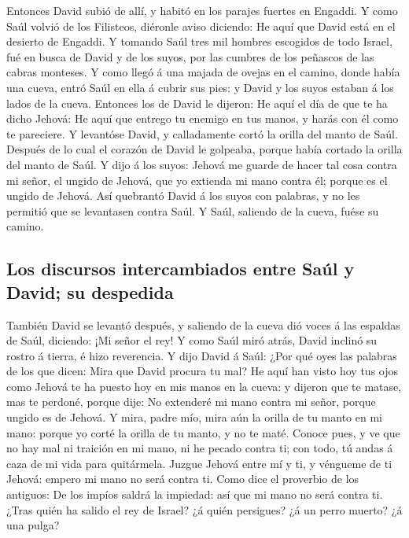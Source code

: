  Entonces David subió de allí, y habitó en los parajes
fuertes en Engaddi.  Y como Saúl volvió de los Filisteos,
diéronle aviso diciendo: He aquí que David está en el desierto de
Engaddi.  Y tomando Saúl tres mil hombres escogidos de todo
Israel, fué en busca de David y de los suyos, por las cumbres de los
peñascos de las cabras monteses.  Y como llegó á una majada
de ovejas en el camino, donde había una cueva, entró Saúl en ella á
cubrir sus pies: y David y los suyos estaban á los lados de la cueva.
 Entonces los de David le dijeron: He aquí el día de que te
ha dicho Jehová: He aquí que entrego tu enemigo en tus manos, y harás
con él como te pareciere. Y levantóse David, y calladamente cortó la
orilla del manto de Saúl.  Después de lo cual el corazón de
David le golpeaba, porque había cortado la orilla del manto de Saúl.
 Y dijo á los suyos: Jehová me guarde de hacer tal cosa
contra mi señor, el ungido de Jehová, que yo extienda mi mano contra él;
porque es el ungido de Jehová.  Así quebrantó David á los
suyos con palabras, y no les permitió que se levantasen contra Saúl. Y
Saúl, saliendo de la cueva, fuése su camino.

\hypertarget{los-discursos-intercambiados-entre-sauxfal-y-david-su-despedida}{%
\subsection{Los discursos intercambiados entre Saúl y David; su
despedida}\label{los-discursos-intercambiados-entre-sauxfal-y-david-su-despedida}}

 También David se levantó después, y saliendo de la cueva
dió voces á las espaldas de Saúl, diciendo: ¡Mi señor el rey! Y como
Saúl miró atrás, David inclinó su rostro á tierra, é hizo reverencia.
 Y dijo David á Saúl: ¿Por qué oyes las palabras de los que
dicen: Mira que David procura tu mal?  He aquí han visto
hoy tus ojos como Jehová te ha puesto hoy en mis manos en la cueva: y
dijeron que te matase, mas te perdoné, porque dije: No extenderé mi mano
contra mi señor, porque ungido es de Jehová.  Y mira, padre
mío, mira aún la orilla de tu manto en mi mano: porque yo corté la
orilla de tu manto, y no te maté. Conoce pues, y ve que no hay mal ni
traición en mi mano, ni he pecado contra ti; con todo, tú andas á caza
de mi vida para quitármela.  Juzgue Jehová entre mí y ti, y
véngueme de ti Jehová: empero mi mano no será contra ti. 
Como dice el proverbio de los antiguos: De los impíos saldrá la
impiedad: así que mi mano no será contra ti.  ¿Tras quién
ha salido el rey de Israel? ¿á quién persigues? ¿á un perro muerto? ¿á
una pulga?

